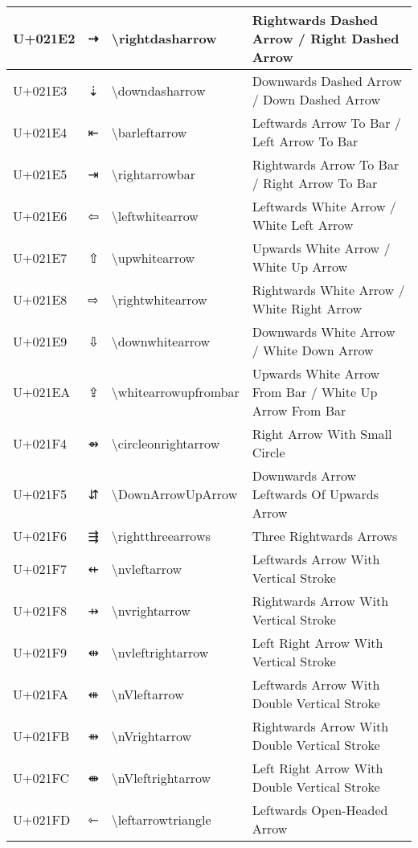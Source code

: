 \begin{table}[h]
\begin{tabulary}{\linewidth}{|L|L|L|L|}
\hline
U+021E2 & ⇢ & {\textbackslash}rightdasharrow & Rightwards Dashed Arrow / Right Dashed Arrow \\
\hline
U+021E3 & ⇣ & {\textbackslash}downdasharrow & Downwards Dashed Arrow / Down Dashed Arrow \\
\hline
U+021E4 & ⇤ & {\textbackslash}barleftarrow & Leftwards Arrow To Bar / Left Arrow To Bar \\
\hline
U+021E5 & ⇥ & {\textbackslash}rightarrowbar & Rightwards Arrow To Bar / Right Arrow To Bar \\
\hline
U+021E6 & ⇦ & {\textbackslash}leftwhitearrow & Leftwards White Arrow / White Left Arrow \\
\hline
U+021E7 & ⇧ & {\textbackslash}upwhitearrow & Upwards White Arrow / White Up Arrow \\
\hline
U+021E8 & ⇨ & {\textbackslash}rightwhitearrow & Rightwards White Arrow / White Right Arrow \\
\hline
U+021E9 & ⇩ & {\textbackslash}downwhitearrow & Downwards White Arrow / White Down Arrow \\
\hline
U+021EA & ⇪ & {\textbackslash}whitearrowupfrombar & Upwards White Arrow From Bar / White Up Arrow From Bar \\
\hline
U+021F4 & ⇴ & {\textbackslash}circleonrightarrow & Right Arrow With Small Circle \\
\hline
U+021F5 & ⇵ & {\textbackslash}DownArrowUpArrow & Downwards Arrow Leftwards Of Upwards Arrow \\
\hline
U+021F6 & ⇶ & {\textbackslash}rightthreearrows & Three Rightwards Arrows \\
\hline
U+021F7 & ⇷ & {\textbackslash}nvleftarrow & Leftwards Arrow With Vertical Stroke \\
\hline
U+021F8 & ⇸ & {\textbackslash}nvrightarrow & Rightwards Arrow With Vertical Stroke \\
\hline
U+021F9 & ⇹ & {\textbackslash}nvleftrightarrow & Left Right Arrow With Vertical Stroke \\
\hline
U+021FA & ⇺ & {\textbackslash}nVleftarrow & Leftwards Arrow With Double Vertical Stroke \\
\hline
U+021FB & ⇻ & {\textbackslash}nVrightarrow & Rightwards Arrow With Double Vertical Stroke \\
\hline
U+021FC & ⇼ & {\textbackslash}nVleftrightarrow & Left Right Arrow With Double Vertical Stroke \\
\hline
U+021FD & ⇽ & {\textbackslash}leftarrowtriangle & Leftwards Open-Headed Arrow \\

\end{tabulary}
\end{table}
